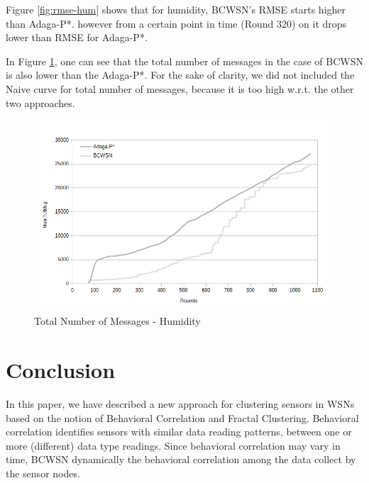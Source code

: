 \documentclass{acm_proc_article-sp}
\begin{document}
Figure \ref{fig:rmse-hum} shows that for 
humidity, BCWSN's RMSE  starts higher than Adaga-P*. however from a certain 
point in time (Round 320) on it drops lower than RMSE for Adaga-P*.

In Figure \ref{fig:tot-num-msg-hum}, one can see that the total number of messages 
in the case of BCWSN is also lower than the Adaga-P*. For the sake of clarity,
we did not included the Naive curve for total number of messages, because it is
too high w.r.t. the other two approaches.

\begin{figure}[!htb]
\begin{center}
	\includegraphics[scale=0.4]{BCWSN-TotNumMsgxRound-PB-2Appr-Hum.png}
	 \vspace*{-.6cm}
    \caption{Total Number of Messages - Humidity}
    \label{fig:tot-num-msg-hum}
\end{center}
\end{figure}
\vspace*{-.3cm}

\section{Conclusion}
\label{conclusion}

In this paper, we have described a new approach for clustering sensors in WSNs
based on the notion of Behavioral Correlation and Fractal Clustering.
Behavioral correlation identifies sensors with similar data reading patterns,
between one or more (different) data type readings. Since behavioral correlation
may vary in time,  BCWSN dynamically the behavioral correlation among the data
collect by the sensor nodes.
\vspace*{-.3cm}
\end{document}
